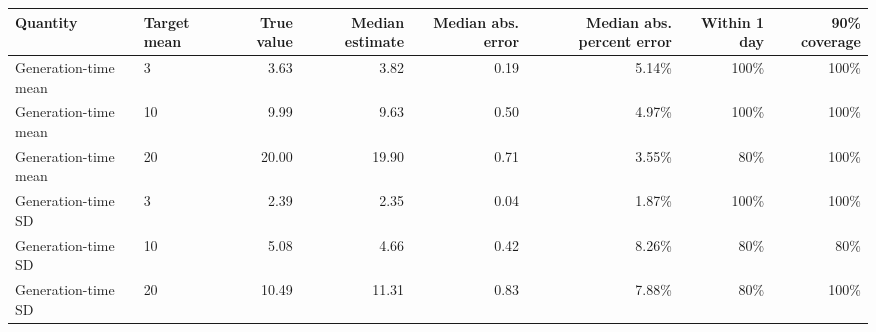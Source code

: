 \begin{tabular}{llrrrrrr}
\hline
Quantity & Target mean & True value & Median estimate & Median abs. error & Median abs. percent error & Within 1 day & 90\% coverage \\
\hline
Generation-time mean &  3 & 3.63 & 3.82 & 0.19 & 5.14\% & 100\% & 100\% \\
Generation-time mean & 10 & 9.99 & 9.63 & 0.50 & 4.97\% & 100\% & 100\% \\
Generation-time mean & 20 & 20.00 & 19.90 & 0.71 & 3.55\% & 80\% & 100\% \\
Generation-time SD &  3 & 2.39 & 2.35 & 0.04 & 1.87\% & 100\% & 100\% \\
Generation-time SD & 10 & 5.08 & 4.66 & 0.42 & 8.26\% & 80\% & 80\% \\
Generation-time SD & 20 & 10.49 & 11.31 & 0.83 & 7.88\% & 80\% & 100\% \\
\hline
\end{tabular}
